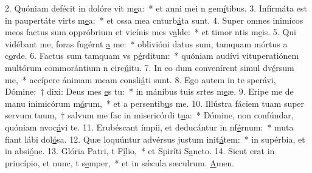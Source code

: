 2. Quóniam defécit in dolóre vit m\uline{e}a:~* et anni mei n gem\uline{í}tibus.
3. Infirmáta est in paupertáte virts m\uline{e}a:~* et ossa mea cnturb\uline{á}ta sunt.
4. Super omnes inimícos meos factus sum oppróbrium et vicínis mes v\uline{a}lde:~* et timor ntis m\uline{e}is.
5. Qui vidébant me, foras fugérnt \uline{a} me:~* oblivióni datus sum, tamquam mórtus a c\uline{o}rde.
6. Factus sum tamquam vs p\uline{é}rditum:~* quóniam audívi vituperatiónem multórum commorántium n circ\uline{ú}itu.
7. In eo dum convenírent simul dv\uline{é}rsum me,~* accípere ánimam meam consli\uline{á}ti sunt.
8. Ego autem in te sperávi, Dómine:~† dixi: Deus mes \uline{e}s tu:~* in mánibus tuis srtes m\uline{e}æ.
9. Eripe me de manu inimicórum m\uline{ó}rum,~* et a persentib\uline{u}s me.
10. Illústra fáciem tuam super servum tuum,~† salvum me fac in misericórdi t\uline{u}a:~* Dómine, non confúndar, quóniam nvoc\uline{á}vi te.
11. Erubéscant ímpii, et deducántur in nf\uline{é}rnum:~* muta fiant lábi dol\uline{ó}sa.
12. Quæ loquúntur advérsus justum init\uline{á}tem:~* in supérbia, et in absi\uline{ó}ne.
13. Glória Patri, t F\uline{í}lio,~* et Spiríti S\uline{a}ncto.
14. Sicut erat in princípio, et nunc, t s\uline{e}mper,~* et in sǽcula sæculrum. \uline{A}men.
